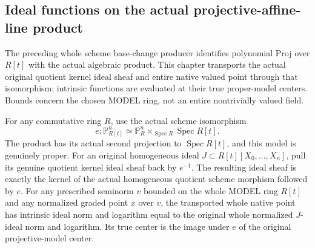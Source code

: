 \subsection{Ideal functions on the actual projective-affine-line product}
\label{subsec:gauss-product-model-functions}

The preceding whole scheme base-change producer identifies polynomial Proj
over $R[t]$ with the actual algebraic product. This chapter transports the
actual original quotient kernel ideal sheaf and entire native valued point
through that isomorphism; intrinsic functions are evaluated at their true
proper-model centers. Bounds concern the chosen MODEL ring, not an entire
nontrivially valued field.

\begin{theorem}
\label{projective:actual-product-model-ideal-functions}
\leanok
{}
For any commutative ring $R$, use the actual scheme isomorphism
\[
 e:\mathbb P^n_{R[t]}\simeq
 \mathbb P^n_R\times_{\operatorname{Spec}R}\operatorname{Spec}R[t].
\]
The product has its actual second projection to $\operatorname{Spec}R[t]$,
and this model is genuinely proper. For an original homogeneous ideal
$J\subset R[t][X_0,\ldots,X_n]$, pull its genuine quotient kernel ideal
sheaf back by $e^{-1}$. The resulting ideal sheaf is exactly the kernel
of the actual homogeneous quotient scheme morphism followed by $e$.
For any prescribed seminorm $v$ bounded on the whole MODEL ring $R[t]$
and any normalized graded point $x$ over $v$, the transported whole native
point has intrinsic ideal norm and logarithm equal to the original whole
normalized $J$-ideal norm and logarithm. Its true center is the image under
$e$ of the original projective-model center.
\end{theorem}
